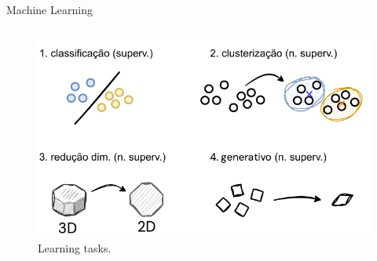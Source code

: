 \documentclass[aspectratio=169,xcolor=dvipsnames]{beamer}
\begin{document}
\begin{frame}{Machine Learning}
\begin{columns}[c]
        \begin{figure}
            \centering
            \includegraphics[width=1\textwidth]{imgs/leaning-tasks.pdf}
            \caption{Learning tasks.}
        \end{figure}



    \end{columns}
\end{frame}




\end{document}
